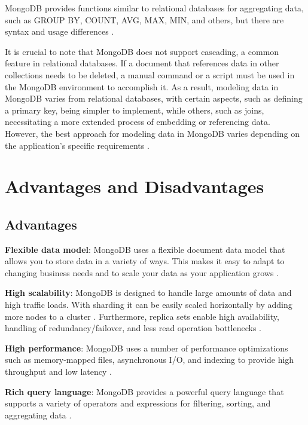 MongoDB provides functions similar to relational databases for aggregating data, such as GROUP BY, COUNT, AVG, MAX, MIN, and others, but there are syntax and usage differences \parencite{mujdrica_comparison}.

It is crucial to note that MongoDB does not support cascading, a common feature in relational databases. If a document that references data in other collections needs to be deleted, a manual command or a script must be used in the MongoDB environment to accomplish it. As a result, modeling data in MongoDB varies from relational databases, with certain aspects, such as defining a primary key, being simpler to implement, while others, such as joins, necessitating a more extended process of embedding or referencing data. However, the best approach for modeling data in MongoDB varies depending on the application's specific requirements \parencite{mujdrica_comparison}.

\section{Advantages and Disadvantages}

\subsection{Advantages}

\textbf{Flexible data model}: MongoDB uses a flexible document data model that allows you to store data in a variety of ways. This makes it easy to adapt to changing business needs and to scale your data as your application grows \parencite{mongodb-datamodels, knowledgenile-pro-con}. 

\textbf{High scalability}: MongoDB is designed to handle large amounts of data and high traffic loads. With sharding it can be easily scaled horizontally by adding more nodes to a cluster \parencite{mongodb-scalability, dataflair_2018}. Furthermore, replica sets enable high availability, handling of redundancy/failover, and less read operation bottlenecks \parencite{mongodb-replica-sets}.

\textbf{High performance}: MongoDB uses a number of performance optimizations such as memory-mapped files, asynchronous I/O, and indexing to provide high throughput and low latency \parencite{mongodb-performance, knowledgenile-pro-con}.

\textbf{Rich query language}: MongoDB provides a powerful query language that supports a variety of operators and expressions for filtering, sorting, and aggregating data \parencite{mongodb-query}.


